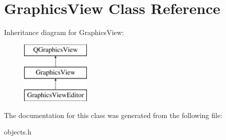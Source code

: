 \hypertarget{class_graphics_view}{\section{Graphics\-View Class Reference}
\label{class_graphics_view}
}
Inheritance diagram for Graphics\-View\-:\begin{figure}[H]
\begin{center}
\leavevmode
\includegraphics[height=3.000000cm]{class_graphics_view}
\end{center}
\end{figure}


The documentation for this class was generated from the following file\-:\begin{DoxyCompactItemize}
\item 
objects.\-h\end{DoxyCompactItemize}
